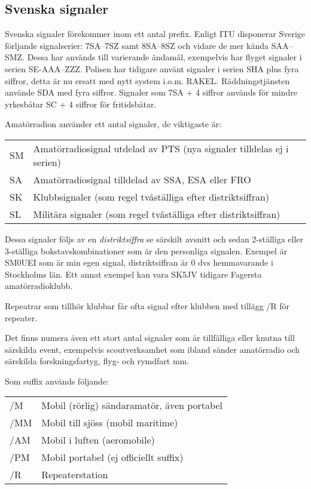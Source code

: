 \subsection{Svenska signaler}

Svenska signaler förekommer inom ett antal prefix. Enligt ITU disponerar Sverige förljande signalserier: 7SA--7SZ samt 8SA--8SZ och vidare de mer kända SAA--SMZ. Dessa har används till varierande ändamål, exempelvis har flyget signaler i serien SE-AAA--ZZZ. Polisen har tidigare använt signaler i serien SHA plus fyra siffror, detta är nu ersatt med nytt system i.o.m. RAKEL. Räddningstjänsten använde SDA med fyra siffror. Signaler som 7SA + 4 siffror används för mindre yrkesbåtar SC + 4 siffror för fritidsbåtar.

Amatörradion använder ett antal signaler, de viktigaste är:

\begin{tabular}{ll}
	SM & Amatörradiosignal utdelad av PTS (nya signaler tilldelas ej i serien) \\
	SA & Amatörradiosignal tilldelad av SSA, ESA eller FRO                     \\
	SK & Klubbsignaler (som regel tvåställiga efter distriktsiffran)           \\
	SL & Militära signaler (som regel tvåställiga efter distriktsiffran)
\end{tabular}

Dessa signaler följs av en \textit{distriktsiffra} se särskilt avsnitt och sedan 2-ställiga eller 3-ställiga bokstavskombinationer som är den personliga signalen. Exempel är SM0UEI som är min egen signal, distriktsiffran är 0 dvs hemmavarande i Stockholms län. Ett annat exempel kan vara SK5JV tidigare Fagersta amatörradioklubb.

Repeatrar som tillhör klubbar får ofta signal efter klubben med tillägg /R för repeater.

Det finns numera även ett stort antal signaler som är tillfälliga eller knutna till särskilda event, exempelvis scoutverksamhet som ibland sänder amatörradio och särskilda forskningsfartyg, flyg- och rymdfart mm.

Som suffix används följande:

\begin{tabular}{ll}
	/M  & Mobil (rörlig) sändaramatör, även portabel \\
	/MM & Mobil till sjöss (mobil maritime)          \\
	/AM & Mobil i luften (aeromobile)                \\
	/PM & Mobil portabel (ej officiellt suffix)\\
	/R  & Repeaterstation
\end{tabular}

